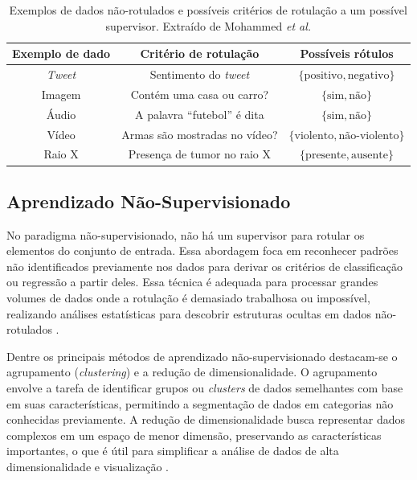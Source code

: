 \documentclass[
	12pt,				%
	openright,			%
	twoside,			%
	a4paper,			%
	tcc,			%
	]{ABNT-DC-UEL}
\begin{document}
\begin{table}[htb]
    \centering
    \begin{tabular}{ccc}
        \hline
        \textbf{Exemplo de dado} & \textbf{Critério de rotulação} & \textbf{Possíveis rótulos} \\ \hline
        \textit{Tweet} & Sentimento do \textit{tweet} & $\{\text{positivo},\text{negativo}\}$ \\
        Imagem & Contém uma casa ou carro? & $\{\text{sim},\text{não}\}$ \\
        Áudio & A palavra ``futebol'' é dita & $\{\text{sim},\text{não}\}$ \\
        Vídeo & Armas são mostradas no vídeo? & $\{\text{violento},\text{não-violento}\}$ \\
        Raio X & Presença de tumor no raio X & $\{\text{presente},\text{ausente}\}$ \\
        \hline
    \end{tabular}
    \caption{Exemplos de dados não-rotulados e possíveis critérios de rotulação a um possível supervisor. Extraído de Mohammed \textit{et al.} \cite{mohammed:16}}
    \label{tab:rotulos}
\end{table}

\subsection{Aprendizado Não-Supervisionado}

No paradigma não-supervisionado, não há um supervisor para rotular os elementos do conjunto de entrada. Essa abordagem foca em reconhecer padrões não identificados previamente nos dados para derivar os critérios de classificação ou regressão a partir deles. Essa técnica é adequada para processar grandes volumes de dados onde a rotulação é demasiado trabalhosa ou impossível, realizando análises estatísticas para descobrir estruturas ocultas em dados não-rotulados \cite{mohammed:16}. 

Dentre os principais métodos de aprendizado não-supervisionado destacam-se o agrupamento (\textit{clustering}) e a redução de dimensionalidade. O agrupamento envolve a tarefa de identificar grupos ou \textit{clusters} de dados semelhantes com base em suas características, permitindo a segmentação de dados em categorias não conhecidas previamente. A redução de dimensionalidade busca representar dados complexos em um espaço de menor dimensão, preservando as características importantes, o que é útil para simplificar a análise de dados de alta dimensionalidade e visualização \cite{usama:19}. 
\end{document}
